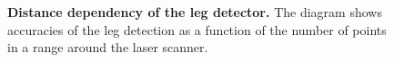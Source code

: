 \begin{figure}
	\label{fig:radius_detection}
		\normalsize
		\begin{center}
			
		\end{center}
		\caption{\textbf{Distance dependency of the leg detector.} The diagram shows accuracies of the leg detection as a function of the number of points in a range around the laser scanner.}
\end{figure}